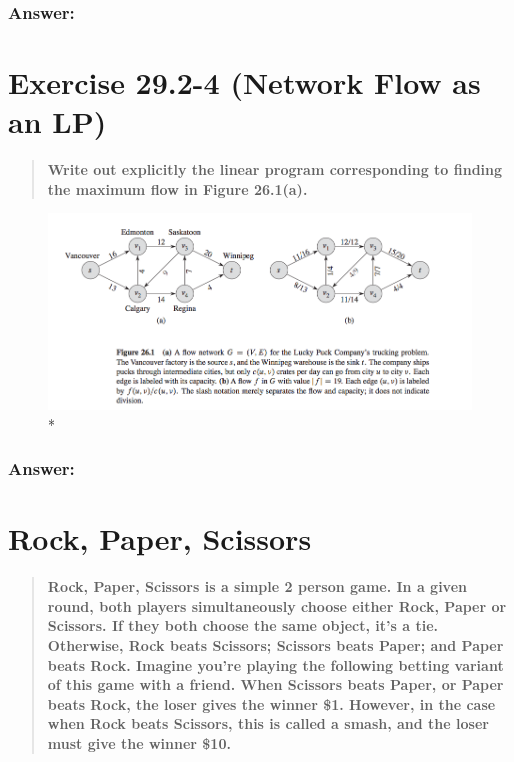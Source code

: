 \documentclass[titlepage]{article}\usepackage[]{graphicx}\usepackage[]{color}
\begin{document}
  \subsubsection{Answer:}
  \vspace{9cm}

\section{Exercise 29.2-4 (Network Flow as an LP)}
  \begin{quote}
    \textbf{Write out explicitly the linear program corresponding to finding
    the maximum flow in Figure 26.1(a).}
  \end{quote}
  \begin{figure}
    \begin{center}
    \includegraphics[scale=0.40]{26.1a.png}\\*
    \end{center}
  \end{figure}

  \subsubsection{Answer:}
  \vspace{9cm}
\section{Rock, Paper, Scissors}
  \begin{quote}
    \textbf{Rock, Paper, Scissors is a simple 2 person game. In a given round,
    both players simultaneously choose either Rock, Paper or Scissors. If they
    both choose the same object, it’s a tie. Otherwise, Rock beats Scissors;
    Scissors beats Paper; and Paper beats Rock. Imagine you’re playing the
    following betting variant of this game with a friend. When Scissors beats
    Paper, or Paper beats Rock, the loser gives the winner \$1. However, in the case
    when Rock beats Scissors, this is called a \textbf{smash}, and the loser must give the
    winner \$10.}
  \end{quote}
\end{document}
